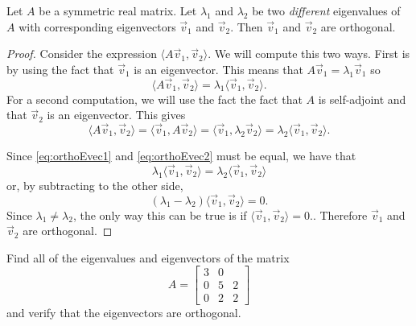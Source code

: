 \documentclass{ximera}
\begin{document}
\begin{theorem}{}
    Let $A$ be a symmetric real matrix. Let $\lambda_1$ and $\lambda_2$ be two \emph{different} eigenvalues of $A$ with corresponding eigenvectors $\vec{v}_1$ and $\vec{v}_2$. Then $\vec{v}_1$ and $\vec{v}_2$ are orthogonal. 
\end{theorem}

\begin{proof}
    Consider the expression $\langle A \vec{v}_1, \vec{v}_2 \rangle$. We will compute this two ways. First is by using the fact that $\vec{v}_1$ is an eigenvector. This means that $A\vec{v}_1 = \lambda_1\vec{v}_1$ so
    \begin{equation}
        \langle A\vec{v}_1, \vec{v}_2 \rangle = \lambda_1\langle \vec{v}_1, \vec{v}_2 \rangle.
        \label{eq:orthoEvec1}
    \end{equation}
    For a second computation, we will use the fact the fact that $A$ is self-adjoint and that $\vec{v}_2$ is an eigenvector. This gives
    \begin{equation}
        \langle A\vec{v}_1, \vec{v}_2 \rangle = \langle \vec{v}_1, A\vec{v}_2 \rangle = \langle \vec{v}_1, \lambda_2\vec{v}_2 \rangle = \lambda_2\langle\vec{v}_1, \vec{v}_2 \rangle.
        \label{eq:orthoEvec2}
    \end{equation}
    
    Since \eqref{eq:orthoEvec1} and \eqref{eq:orthoEvec2} must be equal, we have that
    \[ 
        \lambda_1 \langle \vec{v}_1, \vec{v}_2 \rangle = \lambda_2 \langle \vec{v}_1, \vec{v}_2 \rangle 
    \] 
    or, by subtracting to the other side, 
    \[ 
        (\lambda_1 - \lambda_2) \langle \vec{v}_1, \vec{v}_2 \rangle = 0.
    \]
    Since $\lambda_1 \neq \lambda_2$, the only way this can be true is if $\langle \vec{v}_1, \vec{v}_2 \rangle = 0.$. Therefore $\vec{v}_1$ and $\vec{v}_2$ are orthogonal. 
\end{proof}

\begin{example}
    Find all of the eigenvalues and eigenvectors of the matrix 
    \[ 
        A = 
        \begin{bmatrix} 
            3 & 0 & \\ 
            0 & 5 & 2\\ 
            0 & 2 & 2 
        \end{bmatrix} 
    \] 
    and verify that the eigenvectors are orthogonal.
\end{example}
\end{document}
